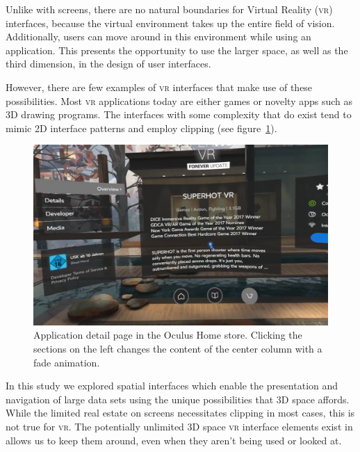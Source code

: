 \documentclass{tufte-book} %
\begin{document}
Unlike with screens, there are no natural boundaries for Virtual Reality (\textsc{vr}) interfaces, because the virtual environment takes up the entire field of vision. Additionally, users can move around in this environment while using an application. This presents the opportunity to use the larger space, as well as the third dimension, in the design of user interfaces.

However, there are few examples of \textsc{vr} interfaces that make use of these possibilities. Most \textsc{vr} applications today are either games or novelty apps such as 3D drawing programs.
The interfaces with some complexity that do exist tend to mimic 2D interface patterns and employ clipping (see figure~\ref{fig:superhot}).

\begin{figure}
  \includegraphics{superhot.png}
  \caption{Application detail page in the Oculus Home store. Clicking the sections on the left changes the content of the center column with a fade animation.}
  \label{fig:superhot}
\end{figure}

In this study we explored spatial interfaces which enable the presentation and navigation of large data sets using the unique possibilities that 3D space affords. While the limited real estate on screens necessitates clipping in most cases, this is not true for \textsc{vr}. The potentially unlimited 3D space \textsc{vr} interface elements exist in allows us to keep them around, even when they aren't being used or looked at.

\end{document}
